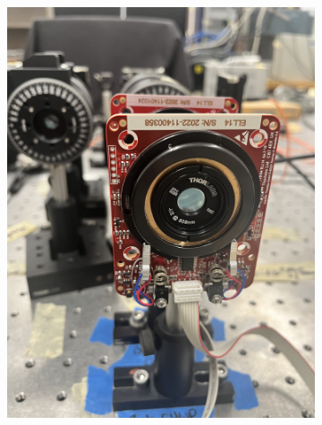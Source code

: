 \documentclass{paper}[11pt]
\begin{document}
\begin{figure}
\begin{subfigure}{0.45\linewidth}
        \includegraphics[width=1\linewidth, angle = -90]{figs/bchwp_zero.jpg}
        \caption{}
        \label{fig:bchwp_zero}
    \end{subfigure}
    \begin{subfigure}{0.45\linewidth}
        \centering

\end{subfigure}
\end{figure}
\end{document}
